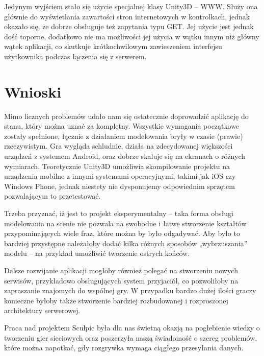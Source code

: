 Jedynym wyjściem stało się użycie specjalnej klasy Unity3D – WWW. Służy ona głównie do wyświetlania zawartości stron internetowych w kontrolkach, jednak okazało się, że dobrze obsługuje też zapytania typu GET. Jej użycie jest jednak dość toporne, dodatkowo nie ma możliwości jej użycia w wątku innym niż główny wątek aplikacji, co skutkuje krótkochwilowym zawieszeniem interfejsu użytkownika podczas łączenia się z serwerem. 

\section{Wnioski}
Mimo licznych problemów udało nam się ostatecznie doprowadzić aplikację do stanu, który można uznać za kompletny. Wszystkie wymagania początkowe zostały spełnione, łącznie z działaniem modelowania bryły w czasie (prawie) rzeczywistym. Gra wygląda schludnie, działa na zdecydowanej większości urządzeń z systemem Android, oraz dobrze skaluje się na ekranach o różnych wymiarach. Teoretycznie Unity3D umożliwia skompilowanie projektu na urządzenia mobilne z innymi systemami operacyjnymi, takimi jak iOS czy Windows Phone, jednak niestety nie dysponujemy odpowiednim sprzętem pozwalającym to przetestować.

Trzeba przyznać, iż jest to projekt eksperymentalny – taka forma obsługi modelowania na scenie nie pozwala na swobodne i łatwe stworzenie kształtów przypominających wiele fraz, które można by było odgadywać. Aby było to bardziej przystępne należałoby dodać kilka różnych sposobów „wybrzuszania” modelu – na przykład umożliwić tworzenie ostrych końców.

Dalsze rozwijanie aplikacji mogłoby również polegać na stworzeniu nowych serwisów, przykładowo obsługujących system przyjaciół, co pozwoliłoby na zapraszanie znajomych do wspólnej gry. W przypadku bardzo dużej ilości graczy konieczne byłoby także stworzenie bardziej rozbudowanej i rozproszonej architektury serwerowej.

Praca nad projektem Sculpic była dla nas świetną okazją na pogłebienie wiedzy o tworzeniu gier sieciowych oraz poszerzyła naszą świadomość o szereg problemów, które można napotkać, gdy rozgrywka wymaga ciągłego przesyłania danych.